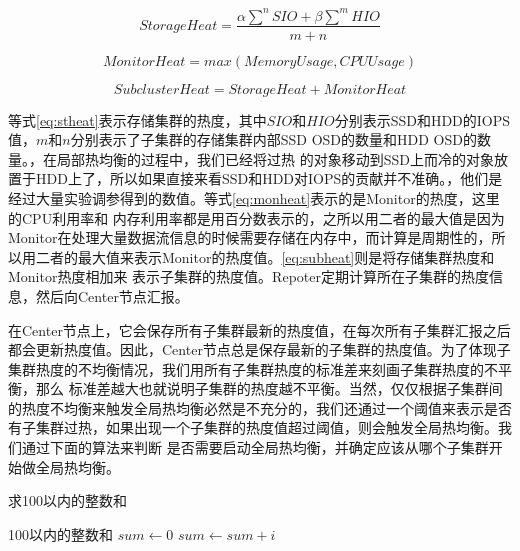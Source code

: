 \begin{equation}
    \label{eq:stheat}
    StorageHeat = \frac{\alpha \sum^n SIO + \beta \sum^m HIO}{m+n}
\end{equation}

\begin{equation}
    \label{eq:monheat}
    MonitorHeat = max(MemoryUsage, CPUUsage)
\end{equation}

\begin{equation}
    \label{eq:subheat}
    SubclusterHeat = StorageHeat + MonitorHeat
\end{equation}


等式\ref{eq:stheat}表示存储集群的热度，其中$SIO$和$HIO$分别表示SSD和HDD的IOPS值，$m$和$n$分别表示了子集群的存储集群内部SSD OSD的数量和HDD OSD的数量。，在局部热均衡的过程中，我们已经将过热
的对象移动到SSD上而冷的对象放置于HDD上了，所以如果直接来看SSD和HDD对IOPS的贡献并不准确。，他们是经过大量实验调参得到的数值。等式\ref{eq:monheat}表示的是Monitor的热度，这里的CPU利用率和
内存利用率都是用百分数表示的，之所以用二者的最大值是因为Monitor在处理大量数据流信息的时候需要存储在内存中，而计算是周期性的，所以用二者的最大值来表示Monitor的热度值。\ref{eq:subheat}则是将存储集群热度和Monitor热度相加来
表示子集群的热度值。Repoter定期计算所在子集群的热度信息，然后向Center节点汇报。

在Center节点上，它会保存所有子集群最新的热度值，在每次所有子集群汇报之后都会更新热度值。因此，Center节点总是保存最新的子集群的热度值。为了体现子集群热度的不均衡情况，我们用所有子集群热度的标准差来刻画子集群热度的不平衡，那么
标准差越大也就说明子集群的热度越不平衡。当然，仅仅根据子集群间的热度不均衡来触发全局热均衡必然是不充分的，我们还通过一个阈值来表示是否有子集群过热，如果出现一个子集群的热度值超过阈值，则会触发全局热均衡。我们通过下面的算法来判断
是否需要启动全局热均衡，并确定应该从哪个子集群开始做全局热均衡。


\begin{algorithm}
    \caption{求100以内的整数和}
    \label{algo:sum_100}
    \begin{algorithmic}[1] %
    \Ensure 100以内的整数和 %
    \State $sum \gets 0$
        \State $sum \gets sum + i$
      \EndFor
    \end{algorithmic}
\end{algorithm}
